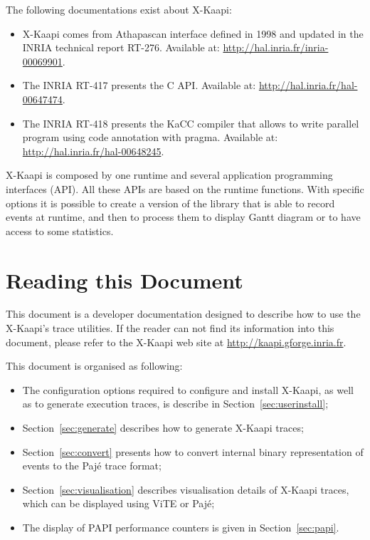 \documentclass{article}[12pt]
\newcommand{\kaapi}{\textsc{X}-Kaapi\xspace}
\begin{document}
The following documentations exist about \kaapi:
\begin{itemize}
\item \kaapi comes from Athapascan interface defined in 1998 and updated in the INRIA technical report RT-276. Available at: \url{http://hal.inria.fr/inria-00069901}.
\item The INRIA RT-417 presents the C API. Available at: \url{http://hal.inria.fr/hal-00647474}.
\item The INRIA RT-418 presents the KaCC compiler that allows to write parallel program using code annotation with pragma. Available at: \url{http://hal.inria.fr/hal-00648245}.
\end{itemize}
\kaapi is composed by one runtime and several application programming interfaces (API).
All these APIs are based on the runtime functions. With specific options it is
possible to create a version of the library that is able to record events at
runtime, and then to process them to display Gantt diagram or to have access to
some statistics.


\section*{Reading this Document}
This document is a developer documentation designed to describe how to use the
\kaapi's trace utilities. If the reader can not find its information into this
document, please refer to the \kaapi web site at
\url{http://kaapi.gforge.inria.fr}.

This document is organised as following:
\begin{itemize}
\item The configuration options required to configure and install \kaapi,
as well as to generate execution traces, is describe in Section~\ref{sec:userinstall};
\item Section~\ref{sec:generate} describes how to generate \kaapi traces;
\item Section~\ref{sec:convert} presents how to convert internal binary
representation of events to the Paj\'e trace format;
\item Section~\ref{sec:visualisation} describes visualisation details of \kaapi traces, which
can be displayed using ViTE or Paj\'e;
\item The display of PAPI performance counters is given in Section~\ref{sec:papi}.
\end{itemize}
\end{document}
